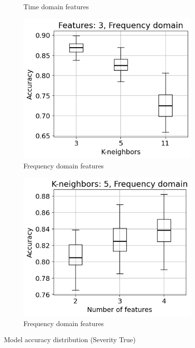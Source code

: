 \begin{figure}[h]
\begin{subfigure}[b]{0.48\textwidth}
        \caption{Time domain features}
    \end{subfigure}
    \hfill
    \begin{subfigure}[b]{0.48\textwidth}
        \includegraphics[width=\textwidth]{assets/results/feature-combinations/FD-3-A+B-True-False-F3.png}
        \caption{Frequency domain features}
    \end{subfigure}
    \hfill
    \begin{subfigure}[b]{0.48\textwidth}
        \includegraphics[width=\textwidth]{assets/results/feature-combinations/FD-3-A+B-True-False-K5.png}
        \caption{Frequency domain features}
    \end{subfigure}
    \caption{Model accuracy distribution (Severity True)}
\end{figure}


